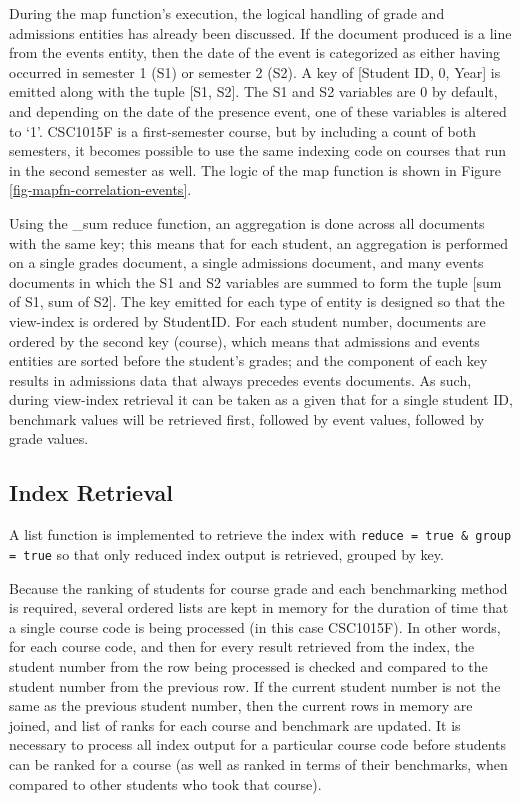 During the map function’s execution, the logical handling of grade and admissions entities has already been discussed. If the document produced is a line from the events entity, then the date of the event is categorized as either having occurred in semester 1 (S1) or semester 2 (S2). A key of [Student ID, 0, Year] is emitted along with the tuple [S1, S2]. The S1 and S2 variables are 0 by default, and depending on the date of the presence event, one of these variables is altered to `1'. CSC1015F is a first-semester course, but by including a count of both semesters, it becomes possible to use the same indexing code on courses that run in the second semester as well. The logic of the map function is shown in Figure \ref{fig-mapfn-correlation-events}.

Using the \_sum reduce function, an aggregation is done across all documents with the same key; this means that for each student, an aggregation is performed on a single grades document, a single admissions document, and many events documents in which the S1 and S2 variables are summed to form the tuple [sum of S1, sum of S2]. The key emitted for each type of entity is designed so that the view-index is ordered by StudentID. For each student number, documents are ordered by the second key (course), which means that admissions and events entities are sorted before the student’s grades; and the  component of each key results in admissions data that always precedes events documents. As such, during view-index retrieval it can be taken as a given that for a single student ID, benchmark values will be retrieved first, followed by event values, followed by grade values.



\subsection{Index Retrieval}
A list function is implemented to retrieve the index with \texttt{reduce = true \& group = true} so that only reduced index output is retrieved, grouped by key.

Because the ranking of students for course grade and each benchmarking method is required, several ordered lists are kept in memory for the duration of time that a single course code is being processed (in this case CSC1015F). In other words, for each course code, and then for every result retrieved from the index, the student number from the row being processed is checked and compared to the student number from the previous row. If the current student number is not the same as the previous student number, then the current rows in memory are joined, and list of ranks for each course and benchmark are updated. It is necessary to process all index output for a particular course code before students can be ranked for a course (as well as ranked in terms of their benchmarks, when compared to other students who took that course).

